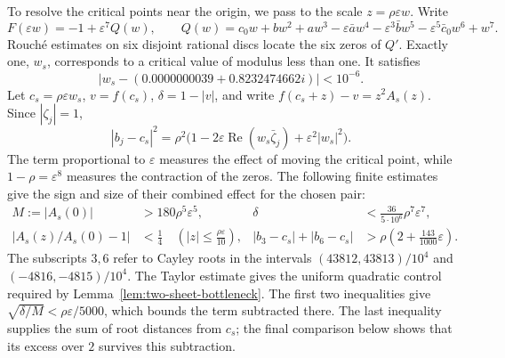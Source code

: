 \documentclass[11pt]{article}
\begin{document}
To resolve the critical points near the origin, we pass to the scale
$z=\rho\varepsilon w$. Write
\[
 F(\varepsilon w)=-1+\varepsilon^7Q(w),\qquad
 Q(w)=c_0w+bw^2+aw^3-\varepsilon\bar a w^4
                  -\varepsilon^3\bar b w^5-\varepsilon^5\bar c_0w^6+w^7.
\]
Rouch\'e estimates on six disjoint rational discs locate the six zeros
of $Q'$. Exactly one, $w_s$, corresponds to a critical value of modulus
less than one. It satisfies
\[
 |w_s-(0.0000000039+0.8232474662i)|<10^{-6}.
\]
Let $c_s=\rho\varepsilon w_s$, $v=f(c_s)$, $\delta=1-|v|$, and write
$f(c_s+z)-v=z^2A_s(z)$. Since $|\zeta_j|=1$,
\[
 |b_j-c_s|^2=\rho^2\bigl(1-2\varepsilon\operatorname{Re}
 (w_s\bar\zeta_j)+\varepsilon^2|w_s|^2\bigr).
\]
The term proportional to $\varepsilon$ measures the effect of moving
the critical point, while $1-\rho=\varepsilon^8$ measures the contraction
of the zeros. The following finite estimates give the sign and size of
their combined effect for the chosen pair:
\begin{align}
 M:=|A_s(0)|&>180\rho^5\varepsilon^5,&
 \delta&<\frac{36}{5\cdot10^6}\rho^7\varepsilon^7,
       \label{eq:ani-estimates}\\
 \left|A_s(z)/A_s(0)-1\right|&<\frac14
       \quad\left(|z|\le\frac{\rho\varepsilon}{10}\right),&
 |b_3-c_s|+|b_6-c_s|&>
       \rho\left(2+\frac{143}{1000}\varepsilon\right).
       \label{eq:ani-distances}
\end{align}
The subscripts $3,6$ refer to Cayley roots in the intervals
$(43812,43813)/10^4$ and $(-4816,-4815)/10^4$.
The Taylor estimate gives the uniform quadratic control required by
Lemma~\ref{lem:two-sheet-bottleneck}. The first two inequalities give
$\sqrt{\delta/M}<\rho\varepsilon/5000$, which bounds the term subtracted
there. The last inequality supplies the sum of root distances from
$c_s$; the final comparison below shows that its excess over $2$
survives this subtraction.
\end{document}
